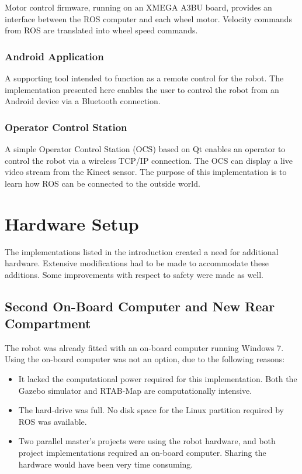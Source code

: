 Motor control firmware, running on an XMEGA A3BU board, provides an interface between the \ac{ROS} computer and each wheel motor. Velocity commands from \ac{ROS} are translated into wheel speed commands.

\subsubsection{Android Application}
A supporting tool intended to function as a remote control for the robot. The implementation presented here enables the user to control the robot from an Android device via a Bluetooth connection.

\subsubsection{Operator Control Station}

A simple Operator Control Station (OCS) based on Qt enables an operator to control the robot via a wireless TCP/IP connection. The \ac{OCS} can display a live video stream from the Kinect sensor. The purpose of this implementation is to learn how \ac{ROS} can be connected to the outside world.

\section{Hardware Setup}

The implementations listed in the introduction created a need for additional hardware. Extensive modifications had to be made to accommodate these additions. Some improvements with respect to safety were made as well.

\subsection{Second On-Board Computer and New Rear Compartment}

The robot was already fitted with an on-board computer running Windows 7. Using the on-board computer was not an option, due to the following reasons:
\begin{itemize}
\item It lacked the computational power required for this implementation. Both the Gazebo simulator and \ac{RTAB-Map} are computationally intensive.
\item The hard-drive was full. No disk space for the Linux partition required by \ac{ROS} was available.
\item Two parallel master's projects were using the robot hardware, and both project implementations required an on-board computer. Sharing the hardware would have been very time consuming.
\end{itemize} 

